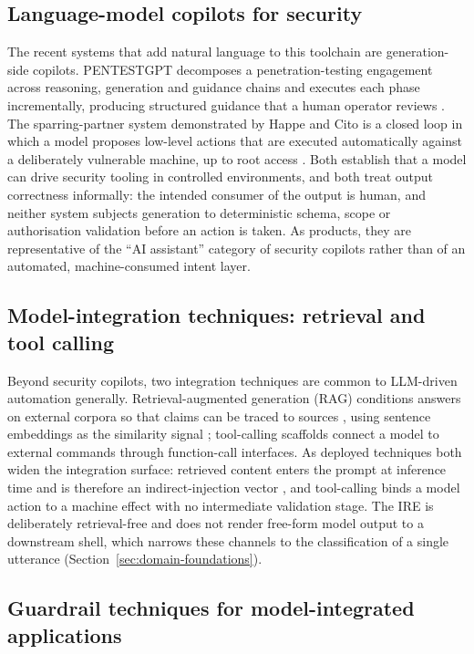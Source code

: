\subsection*{Language-model copilots for security}

The recent systems that add natural language to this toolchain are generation-side
copilots. PENTESTGPT decomposes a penetration-testing engagement across reasoning,
generation and guidance chains and executes each phase incrementally, producing
structured guidance that a human operator reviews \parencite{deng2024pentestgpt}.
The sparring-partner system demonstrated by Happe and Cito is a closed loop in
which a model proposes low-level actions that are executed automatically against
a deliberately vulnerable machine, up to root access \parencite{happe2023pwned}.
Both establish that a model can drive security tooling in controlled
environments, and both treat output correctness informally: the intended consumer
of the output is human, and neither system subjects generation to deterministic
schema, scope or authorisation validation before an action is taken. As products,
they are representative of the ``AI assistant'' category of security copilots
rather than of an automated, machine-consumed intent layer.

\subsection*{Model-integration techniques: retrieval and tool calling}

Beyond security copilots, two integration techniques are common to LLM-driven
automation generally. Retrieval-augmented generation (RAG) conditions answers on
external corpora so that claims can be traced to sources
\parencite{lewis2020rag}, using sentence embeddings as the similarity signal
\parencite{reimers2019sbert}; tool-calling scaffolds connect a model to external
commands through function-call interfaces. As deployed techniques both widen the
integration surface: retrieved content enters the prompt at inference time and is
therefore an indirect-injection vector \parencite{greshake2023indirect}, and
tool-calling binds a model action to a machine effect with no intermediate
validation stage. The IRE is deliberately retrieval-free and does not render
free-form model output to a downstream shell, which narrows these channels to the
classification of a single utterance (Section~\ref{sec:domain-foundations}).

\subsection*{Guardrail techniques for model-integrated applications}

